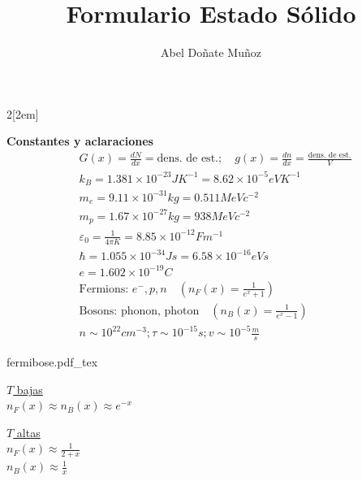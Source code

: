 \documentclass[leqno]{article}
\title{Formulario Estado Sólido}
\author{Abel Doñate Muñoz}
\date{}
\newcommand{\incfig}[1]{%
\begin{center}
\def\svgwidth{0.9\columnwidth}
{#1.pdf_tex}
\end{center}
}
\begin{document}
\begin{multicols}{2}[\columnsep2em]

\textbf{Constantes y aclaraciones}
\begin{align*}
& G(x) = \frac{dN}{dx} = \text{dens. de est.}; \quad g(x)= \frac{dn}{dx} = \frac{\text{dens. de est.}}{V}\\
&k_B = 1.381\times 10^{-23}JK^{-1} = 8.62\times 10^{-5}eVK^{-1}\\
&m_e = 9.11\times 10^{-31}kg = 0.511MeVc^{-2}\\
&m_p = 1.67\times 10^{-27}kg = 938MeVc^{-2}\\
&\varepsilon _0 = \frac{1}{4\pi K} = 8.85\times 10^{-12} Fm^{-1}\\
&\hbar = 1.055\times 10^{-34} Js = 6.58\times 10^{-16}eVs \\
&e = 1.602 \times 10^{-19} C\\
&\text{Fermions: }e^-, p, n \quad (n_F(x) = \frac{1}{e ^{x}+1})\\
& \text{Bosons: phonon, photon} \quad (n_B(x)=\frac{1}{e ^{x} -1})\\
& n\sim 10 ^{22}cm ^{-3}; \tau \sim 10 ^{-15}s; v\sim 10 ^{-5}\frac{m}{s}
\end{align*}
\begin{minipage}{0.5\columnwidth}
\incfig{fermibose}
\end{minipage}
\begin{minipage}{0.7\columnwidth}
  \underline{$T$ bajas}\\
 $n_F(x) \approx n_B(x)\approx e ^{-x}$

  \underline{$T$ altas}\\
 $n_F(x) \approx \frac{1}{2+x}$ \\
 $n_B(x) \approx \frac{1}{x}$

\end{minipage}




\end{multicols}
\end{document}
